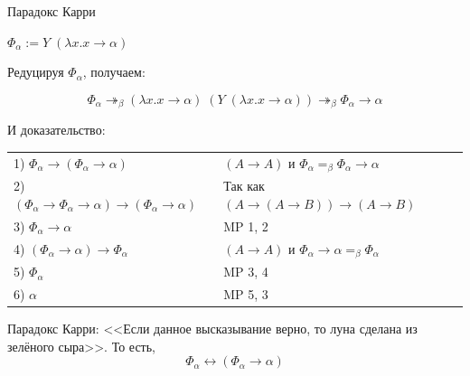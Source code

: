 \documentclass[aspectratio=169]{beamer}
\begin{document}
\begin{frame}{Парадокс Карри}

$\Phi_{\alpha} := Y\;(\lambda x.x \rightarrow \alpha)$

Редуцируя $\Phi_{\alpha}$, получаем:

$$\Phi_{\alpha}  \twoheadrightarrow_\beta (\lambda x.x \rightarrow \alpha)\;(Y\;(\lambda x.x \rightarrow \alpha)) \twoheadrightarrow_\beta\Phi_{\alpha} \rightarrow \alpha$$

И доказательство:

\begin{tabular}{ll}
	1) $\Phi_\alpha\rightarrow(\Phi_\alpha\rightarrow\alpha)$ & $(A\rightarrow A)$ и $\Phi_{\alpha} =_{\beta} \Phi_{\alpha} \rightarrow \alpha$\\
	2) $(\Phi_\alpha\rightarrow\Phi_\alpha\rightarrow\alpha)\rightarrow(\Phi_\alpha\rightarrow\alpha)$ & Так как $(A \rightarrow (A \rightarrow B)) \rightarrow (A \rightarrow B)$\\
	3) $\Phi_\alpha\rightarrow\alpha$ & MP 1, 2\\
	4) $(\Phi_\alpha \rightarrow \alpha) \rightarrow \Phi_\alpha$ & $(A\rightarrow A)$ и $\Phi_\alpha \rightarrow \alpha =_{\beta} \Phi_\alpha$\\
	5) $\Phi_\alpha$ & MP 3, 4\\
	6) $\alpha$ & MP 5, 3
\end{tabular}

Парадокс Карри: <<Если данное высказывание верно, то луна сделана из зелёного сыра>>. То есть,
$$\Phi_\alpha \leftrightarrow (\Phi_\alpha\rightarrow\alpha)$$

\end{frame}
\end{document}
